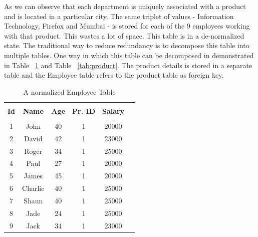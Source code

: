 \documentclass[12pt, oneside]{book}
\begin{document}
As we can observe that each department is uniquely associated with a product and is located in a particular city. The same triplet of values - Information Technology, Firefox and Mumbai - is stored for each of the 9 employees working with that product. This wastes a lot of space. This table is in a de-normalized state. The traditional way to reduce redundancy is to decompose this table into multiple tables. One way in which this table can be decomposed in demonstrated in Table ~\ref{tab:emp_normal} and Table ~\ref{tab:product}. The product details is stored in a separate table and the Employee table refers to the product table as foreign key.

\begin{table}
    \centering
    \begin{tabular}{| c | c | c | c | c | @{}m{0pt}@{}}
    \hline
    \multicolumn{1}{|c|}{} & \multicolumn{1}{c|}{} & \multicolumn{1}{c|}{} & \multicolumn{1}{c|}{} & \multicolumn{1}{c|}{} &  \\
    \multicolumn{1}{|c|}{\textbf{Id}} & \multicolumn{1}{c|}{\textbf{Name}} & \multicolumn{1}{c|}{\textbf{Age}} & \multicolumn{1}{c|}{\textbf{Pr. ID}} & \multicolumn{1}{c|}{\textbf{Salary}} & \\
    \multicolumn{1}{|c|}{} & \multicolumn{1}{c|}{} & \multicolumn{1}{c|}{} & \multicolumn{1}{c|}{} & \multicolumn{1}{c|}{} &  \\
    \hline
    1 & John & 40 & 1 & 20000 & \\ [1ex] \hline
    2 & David & 42 & 1 & 23000 & \\ [1ex] \hline
    3 & Roger & 34 & 1 & 25000 & \\ [1ex] \hline
    4 & Paul & 27 & 1 & 20000 & \\ [1ex] \hline
    5 & James & 45 & 1 & 20000 & \\ [1ex] \hline
    6 & Charlie & 40 & 1 & 25000 & \\ [1ex] \hline
    7 & Shaun & 40 & 1 & 25000 & \\ [1ex] \hline
    8 & Jade & 24 & 1 & 25000 & \\ [1ex] \hline
    9 & Jack & 34 & 1 & 23000 & \\ [1ex] \hline
    \end{tabular}
    \caption{A normalized Employee Table}
    \label{tab:emp_normal}
\end{table}
\end{document}

